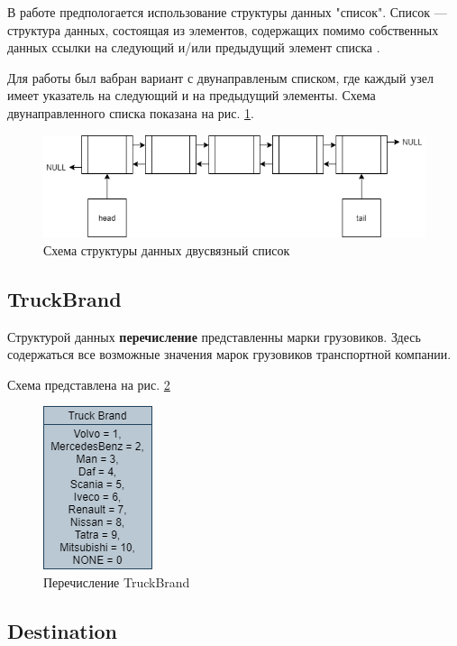 В работе предпологается использование структуры данных "список".
Список --- структура данных, состоящая из элементов, 
содержащих помимо собственных данных ссылки на 
следующий и/или предыдущий элемент списка \cite{list_defenition}.

Для работы был вабран вариант с двунаправленым списком, 
где каждый узел имеет указатель на следующий и на предыдущий элементы.
Схема двунаправленного списка показана на рис. \ref{list_schema}.

\begin{figure}[hpt!]
    \centering
    \includegraphics[width=1\linewidth]{photo/list_schema}
    \caption{Схема структуры данных двусвязный список}
    \label{list_schema}
\end{figure}

\subsection{TruckBrand}

Структурой данных \textbf{перечисление} представленны марки грузовиков.
Здесь содержаться все возможные значения марок грузовиков транспортной компании. 

Схема представлена на рис. \ref{truck_brand}

\begin{figure}[hpt!]
    \centering
    \includegraphics[width=0.2\linewidth]{photo/truck_brand}
    \caption{Перечисление TruckBrand}
    \label{truck_brand}
\end{figure}

\subsection{Destination}


